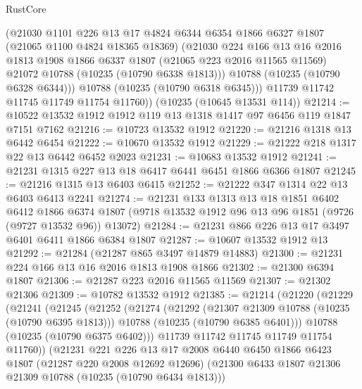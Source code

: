 \begin{lexlean}{RustCore}
\begin{coremodule}
          (@21030
            @1101
            @226
            @13
            @17
            @4824
            @6344
            @6354
            @1866
            @6327
            @1807
            (@21065 @1100 @4824 @18365 @18369)
            (@21030
              @224
              @166
              @13
              @16
              @2016
              @1813
              @1908
              @1866
              @6337
              @1807
              (@21065 @223 @2016 @11565 @11569)
              @21072
              @10788
              (@10235 (@10790 @6338 @1813)))
            @10788
            (@10235 (@10790 @6328 @6344)))
          @10788
          (@10235 (@10790 @6318 @6345)))
        @11739
        @11742
        @11745
        @11749
        @11754
        @11760))
    (@10235 (@10645 @13531 @114))
@21214 := @10522 @13532 @1912 @1912 @119 @13 @1318 @1417 @97 @6456 @119 @1847 @7151 @7162
@21216 := @10723 @13532 @1912
@21220 := @21216 @1318 @13 @6442 @6454
@21222 := @10670 @13532 @1912
@21229 := @21222 @218 @1317 @22 @13 @6442 @6452 @2023
@21231 := @10683 @13532 @1912
@21241 := @21231 @1315 @227 @13 @18 @6417 @6441 @6451 @1866 @6366 @1807
@21245 := @21216 @1315 @13 @6403 @6415
@21252 := @21222 @347 @1314 @22 @13 @6403 @6413 @2241
@21274 := @21231
    @133
    @1313
    @13
    @18
    @1851
    @6402
    @6412
    @1866
    @6374
    @1807
    (@9718 @13532 @1912 @96 @13 @96 @1851 (@9726 (@9727 @13532 @96)) @13072)
@21284 := @21231 @866 @226 @13 @17 @3497 @6401 @6411 @1866 @6384 @1807
@21287 := @10607 @13532 @1912 @13
@21292 := @21284 (@21287 @865 @3497 @14879 @14883)
@21300 := @21231 @224 @166 @13 @16 @2016 @1813 @1908 @1866
@21302 := @21300 @6394 @1807
@21306 := @21287 @223 @2016 @11565 @11569
@21307 := @21302 @21306
@21309 := @10782 @13532 @1912
@21385 := @21214
    (@21220
      (@21229
        (@21241
          (@21245
            (@21252
              (@21274
                (@21292
                  (@21307 @21309 @10788 (@10235 (@10790 @6395 @1813)))
                  @10788
                  (@10235 (@10790 @6385 @6401)))
                @10788
                (@10235 (@10790 @6375 @6402)))
              @11739
              @11742
              @11745
              @11749
              @11754
              @11760))
          (@21231
            @221
            @226
            @13
            @17
            @2008
            @6440
            @6450
            @1866
            @6423
            @1807
            (@21287 @220 @2008 @12692 @12696)
            (@21300 @6433 @1807 @21306 @21309 @10788 (@10235 (@10790 @6434 @1813)))

\end{coremodule}
\end{lexlean}
